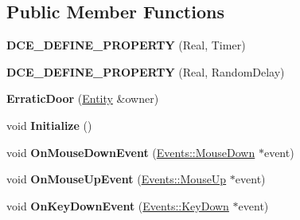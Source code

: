 \subsection*{Public Member Functions}
\begin{DoxyCompactItemize}
\item 
\hypertarget{classDCEngine_1_1Components_1_1ErraticDoor_af6a12c2c26daee0e095fd335dd8e71ee}{{\bfseries D\-C\-E\-\_\-\-D\-E\-F\-I\-N\-E\-\_\-\-P\-R\-O\-P\-E\-R\-T\-Y} (Real, Timer)}\label{classDCEngine_1_1Components_1_1ErraticDoor_af6a12c2c26daee0e095fd335dd8e71ee}

\item 
\hypertarget{classDCEngine_1_1Components_1_1ErraticDoor_ae4f9a599a4548fad0fe86d32c22b5941}{{\bfseries D\-C\-E\-\_\-\-D\-E\-F\-I\-N\-E\-\_\-\-P\-R\-O\-P\-E\-R\-T\-Y} (Real, Random\-Delay)}\label{classDCEngine_1_1Components_1_1ErraticDoor_ae4f9a599a4548fad0fe86d32c22b5941}

\item 
\hypertarget{classDCEngine_1_1Components_1_1ErraticDoor_a5d4fa1ac80117077b10fa7878a868ade}{{\bfseries Erratic\-Door} (\hyperlink{classDCEngine_1_1Entity}{Entity} \&owner)}\label{classDCEngine_1_1Components_1_1ErraticDoor_a5d4fa1ac80117077b10fa7878a868ade}

\item 
\hypertarget{classDCEngine_1_1Components_1_1ErraticDoor_a0cc1c33499475ff99e1c4c2316b1edbc}{void {\bfseries Initialize} ()}\label{classDCEngine_1_1Components_1_1ErraticDoor_a0cc1c33499475ff99e1c4c2316b1edbc}

\item 
\hypertarget{classDCEngine_1_1Components_1_1ErraticDoor_ada3319662892ce026c0232576296b32d}{void {\bfseries On\-Mouse\-Down\-Event} (\hyperlink{classDCEngine_1_1Events_1_1MouseDown}{Events\-::\-Mouse\-Down} $\ast$event)}\label{classDCEngine_1_1Components_1_1ErraticDoor_ada3319662892ce026c0232576296b32d}

\item 
\hypertarget{classDCEngine_1_1Components_1_1ErraticDoor_aca72a8512a7c76c9dc8a1a47a820e83b}{void {\bfseries On\-Mouse\-Up\-Event} (\hyperlink{classDCEngine_1_1Events_1_1MouseUp}{Events\-::\-Mouse\-Up} $\ast$event)}\label{classDCEngine_1_1Components_1_1ErraticDoor_aca72a8512a7c76c9dc8a1a47a820e83b}

\item 
\hypertarget{classDCEngine_1_1Components_1_1ErraticDoor_a3c02bde7e3bdb047b671fb4912ad69f0}{void {\bfseries On\-Key\-Down\-Event} (\hyperlink{classDCEngine_1_1Events_1_1KeyDown}{Events\-::\-Key\-Down} $\ast$event)}\label{classDCEngine_1_1Components_1_1ErraticDoor_a3c02bde7e3bdb047b671fb4912ad69f0}


\end{DoxyCompactItemize}
